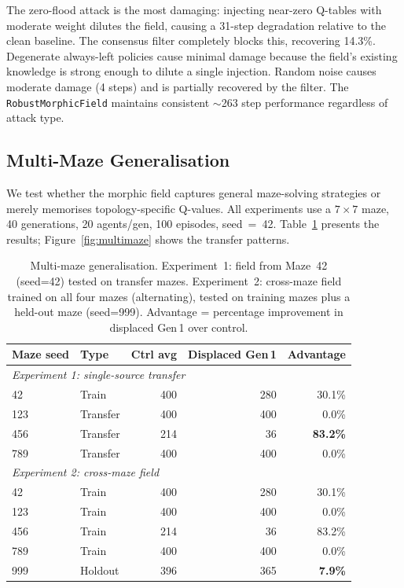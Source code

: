 \documentclass[twoside,11pt]{article}
\begin{document}
The zero-flood attack is the most damaging: injecting near-zero Q-tables with
moderate weight dilutes the field, causing a 31-step degradation relative to
the clean baseline.  The consensus filter completely blocks this, recovering
14.3\%.  Degenerate always-left policies cause minimal damage because the
field's existing knowledge is strong enough to dilute a single injection.
Random noise causes moderate damage (4 steps) and is partially recovered by
the filter.  The \texttt{RobustMorphicField} maintains consistent $\sim$263
step performance regardless of attack type.

\subsection{Multi-Maze Generalisation}
\label{sec:results:multimaze}

We test whether the morphic field captures general maze-solving strategies or
merely memorises topology-specific Q-values.  All experiments use a $7\times7$
maze, 40 generations, 20 agents/gen, 100 episodes, seed~=~42.
Table~\ref{tab:multimaze} presents the results;
Figure~\ref{fig:multimaze} shows the transfer patterns.

\begin{table}[ht]
\centering
\caption{Multi-maze generalisation.  Experiment~1: field from Maze~42
(seed=42) tested on transfer mazes.  Experiment~2: cross-maze field trained
on all four mazes (alternating), tested on training mazes plus a held-out
maze (seed=999).  Advantage = percentage improvement in displaced Gen\,1 over
control.}
\label{tab:multimaze}
\begin{tabular}{@{}llrrr@{}}
\toprule
\textbf{Maze seed} & \textbf{Type} & \textbf{Ctrl avg} &
\textbf{Displaced Gen\,1} & \textbf{Advantage} \\
\midrule
\multicolumn{5}{l}{\textit{Experiment 1: single-source transfer}} \\
 42 & Train    & 400 & 280 & 30.1\% \\
123 & Transfer & 400 & 400 &  0.0\% \\
456 & Transfer & 214 &  36 & \textbf{83.2\%} \\
789 & Transfer & 400 & 400 &  0.0\% \\
\midrule
\multicolumn{5}{l}{\textit{Experiment 2: cross-maze field}} \\
 42 & Train   & 400 & 280 & 30.1\% \\
123 & Train   & 400 & 400 &  0.0\% \\
456 & Train   & 214 &  36 & 83.2\% \\
789 & Train   & 400 & 400 &  0.0\% \\
999 & Holdout & 396 & 365 &  \textbf{7.9\%} \\
\bottomrule
\end{tabular}
\end{table}
\end{document}
